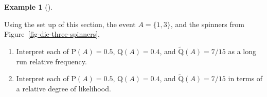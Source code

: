 \documentclass[
  letterpaper,
  DIV=11,
  numbers=noendperiod]{scrreprt}
\providecommand{\tightlist}{%
  \setlength{\itemsep}{0pt}\setlength{\parskip}{0pt}}
\theoremstyle{plain}
\theoremstyle{definition}
\newtheorem{example}{Example}[chapter]
\theoremstyle{definition}
\theoremstyle{definition}
\theoremstyle{remark}
\begin{document}
\begin{tcolorbox}[enhanced jigsaw, opacityback=0, left=2mm, colframe=quarto-callout-note-color-frame, toprule=.15mm, breakable, colback=white, leftrule=.75mm, arc=.35mm, rightrule=.15mm, bottomrule=.15mm]

\begin{example}[]\protect\hypertarget{exm-dice-measures-interpret}{}\label{exm-dice-measures-interpret}

Using the set up of this section, the event \(A = \{1, 3\}\), and the
spinners from Figure~\ref{fig-die-three-spinners},

\begin{enumerate}
\def\labelenumi{\arabic{enumi}.}
\tightlist
\item
  Interpret each of \(\textrm{P}(A) = 0.5\), \(\textrm{Q}(A) = 0.4\),
  and \(\tilde{\textrm{Q}}(A) = 7/15\) as a long run relative frequency.
\item
  Interpret each of \(\textrm{P}(A) = 0.5\), \(\textrm{Q}(A) = 0.4\),
  and \(\tilde{\textrm{Q}}(A) = 7/15\) in terms of a relative degree of
  likelihood.
\end{enumerate}

\end{example}

\end{tcolorbox}
\end{document}
